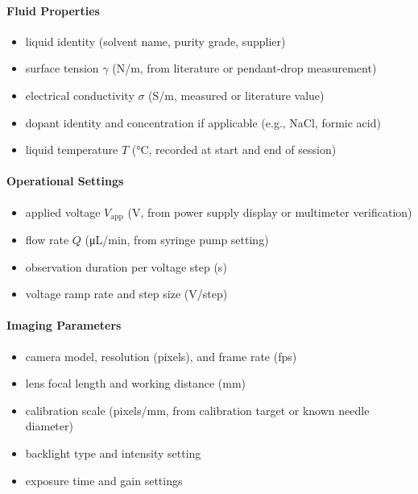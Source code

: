 \paragraph{Fluid Properties}
\begin{itemize}
    \item liquid identity (solvent name, purity grade, supplier)
    \item surface tension $\gamma$ (N/m, from literature or pendant-drop measurement)
    \item electrical conductivity $\sigma$ (S/m, measured or literature value)
    \item dopant identity and concentration if applicable (e.g., NaCl, formic acid)
    \item liquid temperature $T$ (\si{\celsius}, recorded at start and end of session)
\end{itemize}

\paragraph{Operational Settings}
\begin{itemize}
    \item applied voltage $V_{\mathrm{app}}$ (V, from power supply display or multimeter verification)
    \item flow rate $Q$ (\si{\micro\liter/\minute}, from syringe pump setting)
    \item observation duration per voltage step (s)
    \item voltage ramp rate and step size (V/step)
\end{itemize}

\paragraph{Imaging Parameters}
\begin{itemize}
    \item camera model, resolution (pixels), and frame rate (fps)
    \item lens focal length and working distance (mm)
    \item calibration scale (pixels/mm, from calibration target or known needle diameter)
    \item backlight type and intensity setting
    \item exposure time and gain settings
\end{itemize}

